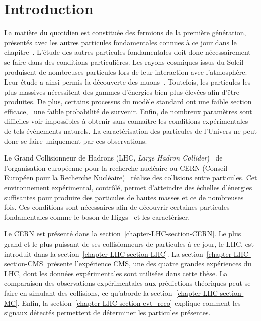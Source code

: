 \section{Introduction}\label{chapter-LHC-section-introduction}
La matière \og du quotidien \fg{} est constituée des fermions de la première génération, présentés avec les autres particules fondamentales connues à ce jour dans le chapitre~.
L'étude des autres particules fondamentales doit donc nécessairement se faire dans des conditions particulières.
Les rayons cosmiques issus du Soleil produisent de nombreuses particules lors de leur interaction avec l'atmosphère.
Leur étude a ainsi permis la découverte des muons~\cite{muon_discovery}.
Toutefois, les particules les plus massives nécessitent des gammes d'énergies bien plus élevées afin d'être produites.
De plus, certains processus du modèle standard ont une faible section efficace, \ie\ une faible probabilité de survenir.
Enfin, de nombreux paramètres sont difficiles voir impossibles à obtenir sans connaître les conditions expérimentales de tels événements naturels.
La caractérisation des particules de l'Univers ne peut donc se faire uniquement par ces observations.
\par Le Grand Collisionneur de Hadrons (LHC, \emph{Large Hadron Collider})~\cite{LHC_paper1,LHC_paper2,LHC_paper3} de l'organisation européenne pour la recherche nucléaire ou CERN (Conseil Européen pour la Recherche Nucléaire)~\cite{CERN_website} réalise des collisions entre particules.
Cet environnement expérimental, contrôlé, permet d'atteindre des échelles d'énergies suffisantes pour produire des particules de hautes masses et ce de nombreuses fois.
Ces conditions sont nécessaires afin de découvrir certaines particules fondamentales comme le boson de Higgs~\cite{ATLAS_Higgs_discovery,CMS_Higgs_discovery,CMS_Higgs_discovery_2013,ATLAS-CMS-Higgs_combined_1,ATLAS-CMS-Higgs_combined_2} et les caractériser.
\par Le CERN est présenté dans la section~\ref{chapter-LHC-section-CERN}.
Le plus grand et le plus puissant de ses collisionneurs de particules à ce jour, le LHC, est introduit dans la section~\ref{chapter-LHC-section-LHC}.
La section~\ref{chapter-LHC-section-CMS} présente l'expérience CMS, une des quatre grandes expériences du LHC, dont les données expérimentales sont utilisées dans cette thèse.
La comparaison des observations expérimentales aux prédictions théoriques peut se faire en simulant des collisions, ce qu'aborde la section~\ref{chapter-LHC-section-MC}.
Enfin, la section~\ref{chapter-LHC-section-evt_reco} explique comment les signaux détectés permettent de déterminer les particules présentes.